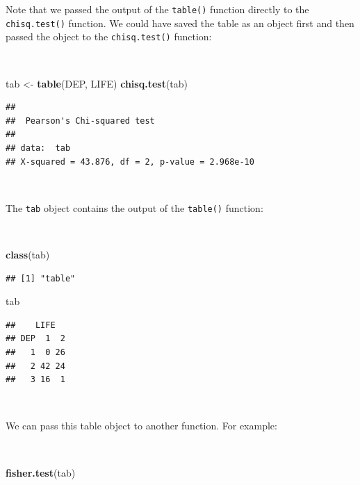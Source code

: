 \documentclass[12pt,a4paper]{book}
\newenvironment{Shaded}{\begin{snugshade}}{\end{snugshade}}
\newcommand{\KeywordTok}[1]{\textcolor[rgb]{0.13,0.29,0.53}{\textbf{#1}}}
\newcommand{\NormalTok}[1]{#1}
\newcommand{\StringTok}[1]{\textcolor[rgb]{0.31,0.60,0.02}{#1}}
\theoremstyle{definition}
\theoremstyle{definition}
\theoremstyle{definition}
\theoremstyle{remark}
\begin{document}
\newpage

Note that we passed the output of the \texttt{table()} function directly
to the \texttt{chisq.test()} function. We could have saved the table as
an object first and then passed the object to the \texttt{chisq.test()}
function:

~

\begin{Shaded}
\begin{Highlighting}[]
\NormalTok{tab <-}\StringTok{ }\KeywordTok{table}\NormalTok{(DEP, LIFE)}
\KeywordTok{chisq.test}\NormalTok{(tab)}
\end{Highlighting}
\end{Shaded}

\begin{verbatim}
## 
##  Pearson's Chi-squared test
## 
## data:  tab
## X-squared = 43.876, df = 2, p-value = 2.968e-10
\end{verbatim}

~

The \texttt{tab} object contains the output of the \texttt{table()}
function:

~

\begin{Shaded}
\begin{Highlighting}[]
\KeywordTok{class}\NormalTok{(tab)}
\end{Highlighting}
\end{Shaded}

\begin{verbatim}
## [1] "table"
\end{verbatim}

\begin{Shaded}
\begin{Highlighting}[]
\NormalTok{tab}
\end{Highlighting}
\end{Shaded}

\begin{verbatim}
##    LIFE
## DEP  1  2
##   1  0 26
##   2 42 24
##   3 16  1
\end{verbatim}

~

We can pass this table object to another function. For example:

~

\begin{Shaded}
\begin{Highlighting}[]
\KeywordTok{fisher.test}\NormalTok{(tab)}
\end{Highlighting}
\end{Shaded}
\end{document}
